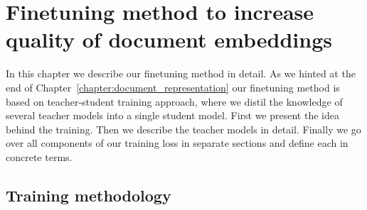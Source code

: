 \chapter{Finetuning method to increase quality of document
embeddings}\label{chapter:training_method}









In this chapter we describe our finetuning method in detail. As we hinted at the
end of Chapter~\ref{chapter:document_representation} our finetuning method is
based on teacher-student training approach, where we distil the knowledge of
several teacher models into a single student model. First we present the idea
behind the training. Then we describe the teacher models in detail. Finally we
go over all components of our training loss in separate sections and define each
in concrete terms.

\section{Training methodology}



